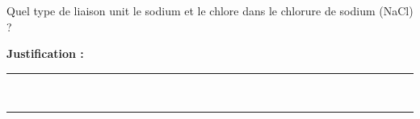 Quel type de liaison unit le sodium et le chlore dans le chlorure de sodium (NaCl) ?

\choices

\noindent\textbf{Justification :} \hrulefill \\[2.5ex]
\rule{\linewidth}{0.4pt} \\[2.5ex]
\rule{\linewidth}{0.4pt}
\vfill
